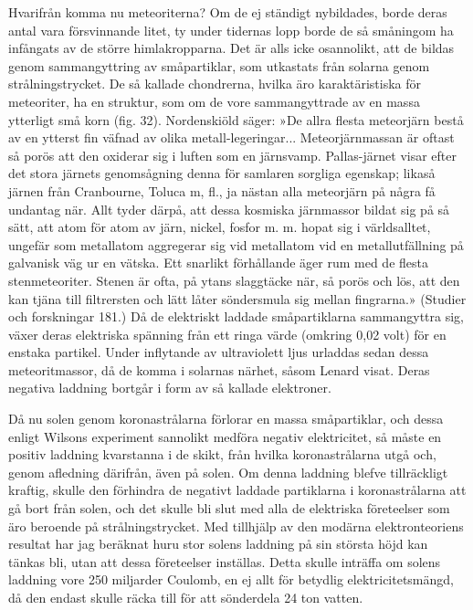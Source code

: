 \documentclass[a4paper, 12pt, oneside, swedish]{article}
\begin{document}
Hvarifrån komma nu meteoriterna? Om de ej ständigt nybildades, borde deras antal vara försvinnande litet, ty under tidernas lopp borde de så småningom ha infångats av de större himlakropparna. Det är alls icke osannolikt, att de bildas genom sammangyttring av småpartiklar, som utkastats från solarna genom strålningstrycket. De så kallade chondrerna, hvilka äro karaktäristiska för meteoriter, ha en struktur, som om de vore sammangyttrade av en massa ytterligt små korn (fig. 32). Nordenskiöld säger: »De allra flesta meteorjärn bestå av en ytterst fin väfnad av olika metall-legeringar... Meteorjärnmassan är oftast så porös att den oxiderar sig i luften som en järnsvamp. Pallas-järnet visar efter det stora järnets genomsågning denna för samlaren sorgliga egenskap; likaså järnen från Cranbourne, Toluca m, fl., ja nästan alla meteorjärn på några få undantag när. Allt tyder därpå, att dessa kosmiska järnmassor bildat sig på så sätt, att atom för atom av järn, nickel, fosfor m. m. hopat sig i världsalltet, ungefär som metallatom aggregerar sig vid metallatom vid en metallutfällning på galvanisk väg ur en vätska. Ett snarlikt förhållande äger rum med de flesta stenmeteoriter. Stenen är ofta, på ytans slaggtäcke när, så porös och lös, att den kan tjäna till filtrersten och lätt låter söndersmula sig mellan fingrarna.» (Studier och forskningar 181.) Då de elektriskt laddade småpartiklarna sammangyttra sig, växer deras elektriska spänning från ett ringa värde (omkring 0,02 volt) för en enstaka partikel. Under inflytande av ultraviolett ljus urladdas sedan dessa meteoritmassor, då de komma i solarnas närhet, såsom Lenard visat. Deras negativa laddning bortgår i form av så kallade elektroner.

Då nu solen genom koronastrålarna förlorar en massa småpartiklar, och dessa enligt Wilsons experiment sannolikt medföra negativ elektricitet, så måste en positiv laddning kvarstanna i de skikt, från hvilka koronastrålarna utgå och, genom afledning därifrån, även på solen. Om denna laddning blefve tillräckligt kraftig, skulle den förhindra de negativt laddade partiklarna i koronastrålarna att gå bort från solen, och det skulle bli slut med alla de elektriska företeelser som äro beroende på strålningstrycket. Med tillhjälp av den modärna elektronteoriens resultat har jag beräknat huru stor solens laddning på sin största höjd kan tänkas bli, utan att dessa företeelser inställas. Detta skulle inträffa om solens laddning vore 250 miljarder Coulomb, en ej allt för betydlig elektricitetsmängd, då den endast skulle räcka till för att sönderdela 24 ton vatten.
\end{document}
